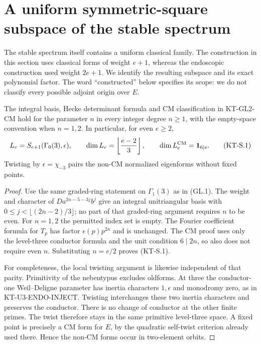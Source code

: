 \section{A uniform symmetric-square subspace of the stable spectrum}
\label{sec:kt-symmetric-square}

The stable spectrum itself contains a uniform classical family.  The
construction in this section uses classical forms of weight $e+1$,
whereas the endoscopic construction used weight $2e+1$.  We identify
the resulting subspace and its exact polynomial factor.  The word
``constructed'' below specifies its scope: we do not classify every
possible adjoint origin over $E$.

\begin{lemma}
The integral basis, Hecke determinant formula and CM classification
in KT-GL2-CM hold for the parameter $n$ in every integer degree
$n\geq1$, with the empty-space convention when $n=1,2$.
In particular, for even $e\geq2$,
\[
 L_e=S_{e+1}(\Gamma_0(3),\epsilon),\qquad
 \dim L_e=\left\lfloor\frac{e-2}{3}\right\rfloor,
 \qquad
 \dim L_e^{\rm CM}={\bf1}_{6\mid e}.                 \tag{KT-S.1}
\]
Twisting by $\epsilon=\chi_{-3}$ pairs the non-CM normalized
eigenforms without fixed points.
\end{lemma}
\begin{proof}
Use the same graded-ring statement on $\Gamma_1(3)$ as in (GL.1).
The weight and character of $Da^{2n-5-3j}b^j$ give an integral
unitriangular basis with $0\leq j<\lfloor(2n-2)/3\rfloor$;
no part of that graded-ring argument requires $n$ to be even.
For $n=1,2$ the permitted index set is empty.  The Fourier
coefficient formula for $T_p$ has factor $\epsilon(p)p^{2n}$
and is unchanged.  The CM proof uses only the level-three
conductor formula and the unit condition $6\mid2n$, so also
does not require even $n$.  Substituting $n=e/2$ proves (KT-S.1).

For completeness, the local twisting argument is likewise
independent of that parity.  Primitivity of the nebentypus
excludes oldforms.  At three the conductor-one Weil--Deligne
parameter has inertia characters $1,\epsilon$ and monodromy
zero, as in KT-U3-ENDO-INJECT.  Twisting interchanges these
two inertia characters and preserves the conductor.  There
is no change of conductor at the other finite primes.
The twist therefore stays in the same primitive level-three
space.  A fixed point is precisely a CM form for $E$, by the
quadratic self-twist criterion already used there.  Hence the
non-CM forms occur in two-element orbits.
\end{proof}

